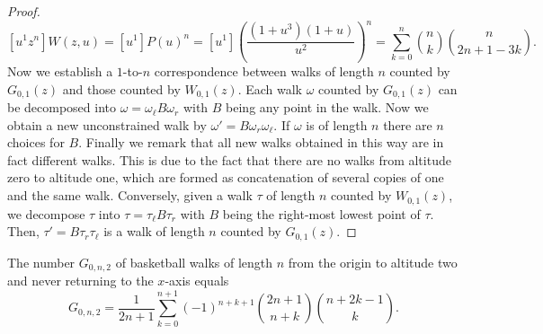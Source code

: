 \begin{proof}
  $$
    [u^{1}z^{n}] W(z,u) = 
    [u^{1}]P(u)^{n} = 
    [u^{1}]\left(\frac{(1+u^{3})(1+u)}{u^{2}}\right)^{n} = 
    \sum_{k=0}^{n}\binom{n}{k}\binom{n}{2n+1-3k}.
  $$
  Now we establish a $1$-to-$n$ correspondence between walks of length $n$ counted by $G_{0,1}(z)$ and those counted by $W_{0,1}(z)$. 
  Each walk $\omega$ counted by $G_{0,1}(z)$ can be decomposed into $\omega = \omega_{\ell}B\omega_r$ with $B$ being any point in the walk. Now we obtain a new unconstrained walk by $\omega' = B\omega_r\omega_\ell$. If $\omega$ is of length $n$ there are $n$ choices for $B$. Finally we remark that all new walks obtained in this way are in fact different walks. This is due to the fact that there are no walks from altitude zero to altitude one, which are formed as concatenation of several copies of one and the same walk.
  Conversely, given a walk $\tau$ of length $n$ counted by $W_{0,1}(z)$, we decompose $\tau$ into $\tau = \tau_{\ell}B\tau_r$ with $B$ being the right-most lowest point of $\tau$. Then, $\tau' = B\tau_{r}\tau_\ell$ is a walk of length $n$ counted by $G_{0,1}(z)$.
\end{proof}

\begin{proposition}
  The number $G_{0,n,2}$ of basketball walks of length $n$ from the origin to altitude two and never returning to the $x$-axis equals
  $$
    G_{0,n,2} = \frac{1}{2n+1}\sum_{k=0}^{n+1}(-1)^{n+k+1}\binom{2n+1}{n+k}\binom{n+2k-1}{k}.
  $$
\end{proposition}


